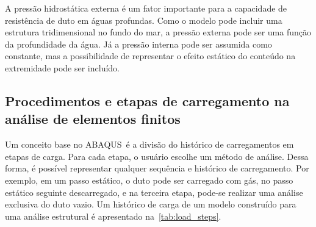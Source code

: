 A pressão hidrostática externa é um fator importante para a capacidade de resistência de duto em águas profundas.
Como o modelo pode incluir uma estrutura tridimensional no fundo do mar, a pressão externa pode ser uma função da profundidade da água.
Já a pressão interna pode ser assumida como constante, mas a possibilidade de representar o efeito estático do conteúdo na extremidade pode ser incluído.


\subsection{Procedimentos e etapas de carregamento na análise de elementos finitos}


Um conceito base no ABAQUS~é a divisão do histórico de carregamentos em etapas de carga. Para cada etapa, o usuário escolhe um método de análise.
Dessa forma, é possível representar qualquer sequência  e histórico de carregamento.
Por exemplo, em um passo estático, o duto pode ser carregado com gás, no passo estático seguinte descarregado, e na terceira etapa, pode-se realizar uma análise exclusiva do duto vazio.
Um histórico de carga de um modelo construído para uma análise estrutural é apresentado na~\autoref{tab:load_steps}.


